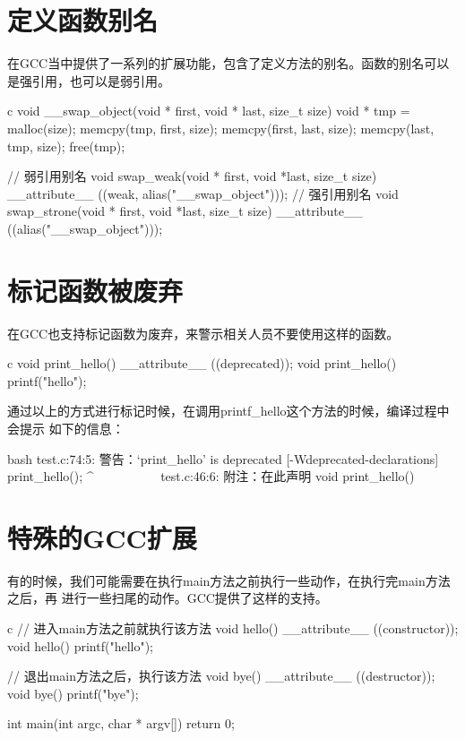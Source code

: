 \section{定义函数别名}
在GCC当中提供了一系列的扩展功能，包含了定义方法的别名。函数的别名可以是强引用，也可以是弱引用。
\begin{code-block}{c}
void __swap_object(void * first, void * last, size_t size)
{
    void * tmp = malloc(size);
    memcpy(tmp, first, size);
    memcpy(first, last, size);
    memcpy(last, tmp, size);
    free(tmp);
}

// 弱引用别名
void swap_weak(void * first, void *last, size_t size)
        __attribute__ ((weak, alias("__swap_object")));
// 强引用别名
void swap_strone(void * first, void *last, size_t size)
        __attribute__ ((alias("__swap_object")));
\end{code-block}

\section{标记函数被废弃}
在GCC也支持标记函数为废弃，来警示相关人员不要使用这样的函数。
\begin{code-block}{c}
void print_hello() __attribute__ ((deprecated));
void print_hello()
{
    printf("hello\n");
}
\end{code-block}

通过以上的方式进行标记时候，在调用printf\_hello这个方法的时候，编译过程中会提示
如下的信息：
\begin{code-block}{bash}
test.c:74:5: 警告：‘print_hello’ is deprecated [-Wdeprecated-declarations]
     print_hello();
     ^~~~~~~~~~~
test.c:46:6: 附注：在此声明
 void print_hello()
\end{code-block}

\section{特殊的GCC扩展}
有的时候，我们可能需要在执行main方法之前执行一些动作，在执行完main方法之后，再
进行一些扫尾的动作。GCC提供了这样的支持。
\begin{code-block}{c}
// 进入main方法之前就执行该方法
void hello() __attribute__ ((constructor));
void hello()
{
    printf("hello\n");
}

// 退出main方法之后，执行该方法
void bye() __attribute__ ((destructor));
void bye()
{
    printf("bye\n");
}

int main(int argc, char * argv[])
{
    return 0;
}
\end{code-block}

